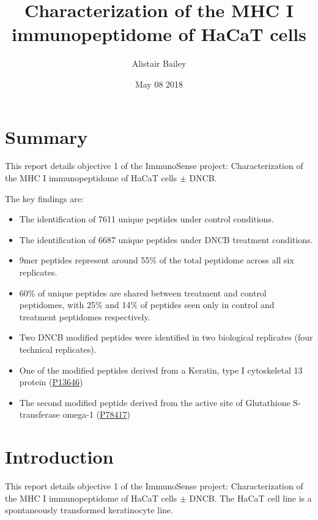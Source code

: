 \documentclass[12pt,]{book}
\title{Characterization of the MHC I immunopeptidome of HaCaT cells}
\author{Alistair Bailey}
\date{May 08 2018}
\providecommand{\tightlist}{%
  \setlength{\itemsep}{0pt}\setlength{\parskip}{0pt}}
\begin{document}
\maketitle

{
\setcounter{tocdepth}{1}
\tableofcontents
}
\listoftables
\listoffigures
\chapter*{Summary}\label{summary}

This report details objective 1 of the ImmunoSense project:
Characterization of the MHC I immunopeptidome of HaCaT cells \(\pm\)
DNCB.

The key findings are:

\begin{itemize}
\tightlist
\item
  The identification of 7611 unique peptides under control conditions.
\item
  The identification of 6687 unique peptides under DNCB treatment
  conditions.
\item
  9mer peptides represent around 55\% of the total peptidome across all
  six replicates.
\item
  60\% of unique peptides are shared between treatment and control
  peptidomes, with 25\% and 14\% of peptides seen only in control and
  treatment peptidomes respectively.
\item
  Two DNCB modified peptides were identified in two biological
  replicates (four technical replicates).
\item
  One of the modified peptides derived from a Keratin, type I
  cytoskeletal 13 protein
  (\href{https://www.uniprot.org/uniprot/P13646}{P13646})
\item
  The second modified peptide derived from the active site of
  Glutathione S-transferase omega-1
  (\href{https://www.uniprot.org/uniprot/P78417}{P78417})
\end{itemize}

\chapter{Introduction}\label{introduction}

This report details objective 1 of the ImmunoSense project:
Characterization of the MHC I immunopeptidome of HaCaT cells
\citep{boukamp1988} \(\pm\) DNCB. The HaCaT cell line is a spontaneously
transformed keratinocyte line.
\end{document}
